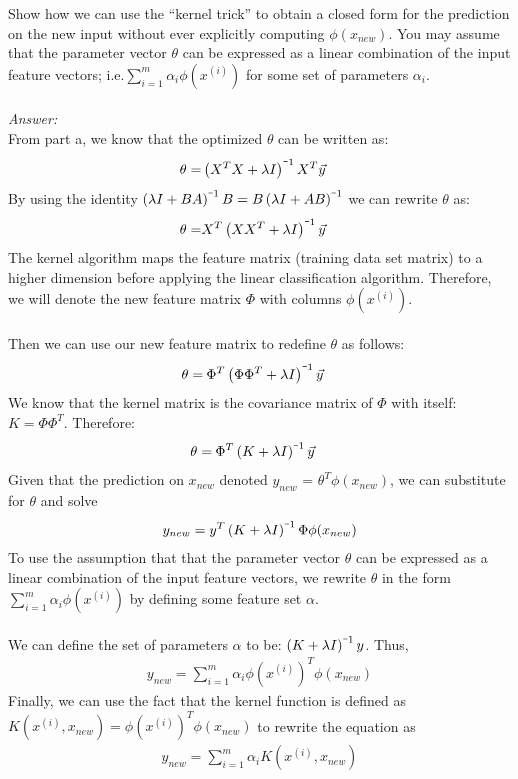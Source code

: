 \documentclass{article}
\newcommand{\minus}{\scalebox{0.5}[1.0]{$-$}}
\begin{document}
\begin{enumerate}[label=(\alph*)]
Show how we can use the “kernel trick” to obtain a closed form for the prediction on the new input without ever explicitly computing $\phi (x_{new})$. You may assume that the parameter vector $\theta$ can be expressed as a linear combination of the input feature
vectors; i.e.$ \sum_{i=1}^{m}\alpha_i \phi (x^{(i)})$ for some set of parameters $\alpha_i$.\\\\
\textit{Answer:}\\
From part a, we know that the optimized $\theta$ can be written as: \begin{align*}
     \theta =& \left(X^TX+\lambda I\right)^{\minus1}X^T\Vec{y}
\end{align*}
By using the identity $\left(\lambda I +BA\right)^{\minus1}B = B\left(\lambda I +AB\right)^{\minus1}$ we can rewrite $\theta$ as: \begin{align*}
    \theta =& X^T\left(XX^T+\lambda I\right)^{\minus1}\Vec{y}
\end{align*}
The kernel algorithm maps the feature matrix (training data set matrix) to a higher dimension before applying the linear classification algorithm. Therefore, we will denote the new feature matrix $\Phi$ with columns $\phi(x^{(i)})$. \\\\Then we can use our new feature matrix to redefine $\theta$ as follows: \begin{align*}
    \theta =&{}\: \Phi^T\left(\Phi\Phi^T+\lambda I\right)^{\minus1}\Vec{y}
\end{align*}
We know that the kernel matrix is the covariance matrix of $\Phi$ with itself: $K = \Phi\Phi^T$. Therefore: \begin{align*}
    \theta =&{}\: \Phi^T\left(K+\lambda I\right)^{\minus1}\Vec{y}
\end{align*} 
Given that the prediction on $x_{new}$ denoted $y_{new}$ = $\theta^T \phi(x_{new})$, we can substitute for $\theta$ and solve \begin{align*}
    y_{new} = y^T\left(K+\lambda I\right)^{\minus1}\Phi \phi(x_{new})
\end{align*} To use the assumption that that the parameter vector $\theta$ can be expressed as a linear combination of the input feature vectors, we rewrite $\theta$ in the form $ \sum_{i=1}^{m}\alpha_i \phi (x^{(i)})$ by defining some feature set $\alpha$.\\\\
We can define the set of parameters $\alpha$ to be: $\left(K+\lambda I\right)^{\minus1}y$. Thus, \begin{align*}
     y_{new}=\sum_{i=1}^{m}\alpha_i \phi (x^{(i)})^T \phi(x_{new})
\end{align*}
Finally, we can use the fact that the kernel function is defined as $K(x^{(i)},x_{new}) = \phi (x^{(i)})^T \phi(x_{new})$ to rewrite the equation as
\begin{align*}
     y_{new}=\sum_{i=1}^{m}\alpha_i K(x^{(i)},x_{new})
\end{align*}
\end{enumerate}
\end{document}
